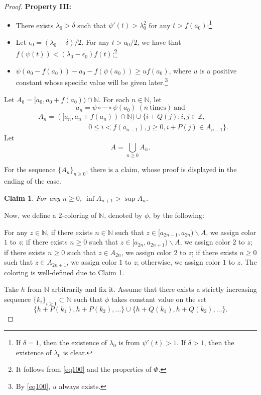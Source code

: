 \documentclass[reqno,12pt]{amsart}
\newtheorem{cl}{Claim}
\def \N {\mathbb N}
\def \Z {\mathbb Z}
\numberwithin{equation}{section}
\begin{document}
\begin{proof}
\noindent \textbf{Property III:}
\begin{itemize}
\item There exists $\lambda_0>\delta$ such that $\psi'(t)>\lambda_0^2$ for any $t>f(a_0)$;\footnote{If $\delta=1$, then the existence of $\lambda_0$ is from $\psi'(t)>1$. If $\delta>1$, then the existence of $\lambda_0$ is clear.}
\item Let $\epsilon_0=(\lambda_0-\delta)/2$. For any $t>a_0/2$, we have that  $f(\psi(t))<(\lambda_0-\epsilon_0)f(t)$;\footnote{It follows from \eqref{eq100} and the properties of $\Phi$.}
\item $\psi(a_0-f(a_0))-a_0-f(\psi(a_0))\geq uf(a_0)$, where $u$ is a positive constant whose specific value will be given later.\footnote{By \eqref{eq100}, $u$ always exists.}
\end{itemize}



	 Let $A_{0}=[a_0,a_0+f(a_0))\cap \N$. For each $n\in \N$, let $$a_n=\psi\circ \cdots \circ \psi(a_0)\ (n\ \text{times})\ \text{and}$$
	 \begin{align*}
	 	& A_{n}=([a_n,a_n+f(a_{n}))\cap\N)\cup \{i+Q(j):i,j\in\Z,
	 	\\ & \hspace{3cm}
	 	0\le i<f(a_{n-1}),j\ge 0,i+P(j)\in A_{n-1}\}.
	 \end{align*}
	 Let $$A=\bigcup_{n\ge 0}A_n.$$
	
	For the sequence $\{A_n\}_{n\ge 0}$, there is a claim, whose proof is displayed in the ending of the case.
	\begin{cl}\label{cl1}
		For any $n\ge 0$, $\inf A_{n+1}>\sup A_n$.
	\end{cl}
	Now, we define a $2$-coloring of $\N$, denoted by $\phi$, by the following:
	
	For any $z\in\N$, if there exists $n\in \N$ such that $z\in [a_{2n-1},a_{2n})\backslash A$, we assign color $1$ to $z$; if there exists $n\ge 0$ such that $z\in [a_{2n},a_{2n+1})\backslash A$, we assign color $2$ to $z$; if there exists $n\ge 0$ such that $z\in A_{2n}$, we assign color $2$ to $z$; if there exists $n\ge 0$ such that $z\in A_{2n+1}$, we assign color $1$ to $z$; otherwise, we assign color $1$ to $z$. The coloring is well-defined due to Claim \ref{cl1}.
	
	Take $h$ from $\N$ arbitrarily and fix it. Assume that there exists a strictly increasing sequence $\{k_i\}_{i\ge 1}\subset \N$ such that $\phi$ takes constant value on the set $$\{h+P(k_1),h+P(k_2),\ldots\}\cup \{h+Q(k_1),h+Q(k_2),\ldots\}.$$
	

\end{proof}
\end{document}
